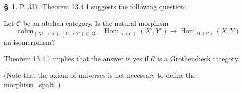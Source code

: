 \documentclass[12pt]{article}
\theoremstyle{remark}
\theoremstyle{definition}
\newtheorem{s}[thm]{\S}
\newcommand{\bb}{\mathbb}
\newcommand{\C}{\mathcal C}
\newcommand{\oo}{\operatorname}
\DeclareMathOperator*{\coli}{colim}
\DeclareMathOperator*{\co}{colim}
\DeclareMathOperator*{\ic}{``\coli"}
\DeclareMathOperator{\Hom}{Hom}%
\DeclareMathOperator{\Mod}{Mod}
\DeclareMathOperator{\op}{op}
\begin{document}
%
%
\begin{comment}
%
\begin{s} 
P. 337. I would state Theorem 13.4.1 as follows:

Let $\C$ be an abelian category. Assume that the functor 
$$
\Hom_\C^\bullet:\oo K(\C)\times\oo K(\C)^{\op}\to\oo D(\Mod(\bb Z))
$$ 
given by $(X',Y')\mapsto\oo{tot}_\pi\Hom_\C^{\bullet,\bullet}(X',Y')$ (see \S\ 11.7) is universally right localizable, and denote its right localization by $\oo R\Hom_\C$. Then we have for $X,Y\in\oo D(\C)$\bigskip 

\noindent$(13.4.1)\hskip6em H^0\oo R\Hom_\C(X,Y)\simeq\Hom_{\oo D(\C)}(X,Y).$\bigskip

Here is variant (slightly stronger and closer to the original):

Let $\C$ be an abelian category, let $X,Y\in\oo D(\C)$. Assume that the inductive limit 
$$
\oo R\Hom_\C(X,Y):=\ic_{(X'\to X),(Y\to Y')\in\oo{Qis}}\oo{tot}_\pi\Hom_\C^{\bullet,\bullet}(X',Y')
$$ 
(see \S\ 11.7) exists in $\oo D(\Mod(\bb Z))$. Then\bigskip 

\noindent$(13.4.1)\hskip6em H^0\oo R\Hom_\C(X,Y)\simeq\Hom_{D(\C)}(X,Y).$
\end{s}
%
\end{comment}
%
%
\begin{s}\label{q337}
P. 337. Theorem 13.4.1 suggests the following question: 

Let $\C$ be an abelian category. Is the natural morphism 
\begin{equation}\label{spalt}
\co_{(X'\to X),(Y\to Y')\in\oo{Qis}}\Hom_{\oo K(\C)}(X',Y')\to\Hom_{\oo D(\C)}(X,Y)
\end{equation} 
an isomorphism?

Theorem 13.4.1 implies that the answer is yes if $\C$ is a Grothendieck category. 

(Note that the axiom of universes is not necessary to define the morphism~\eqref{spalt}.)
\end{s}
%
%
\end{document}
